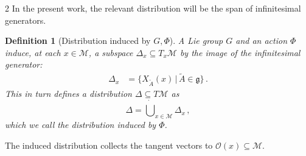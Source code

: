 \documentclass{article}
\newtheorem{definition}[theorem]{Definition}
\newcommand{\yannik}[1]{\textcolor{blue}{\textbf{YW}:~#1}}
\newcommand{\federico}[1]{\textcolor{BrickRed}{\textbf{FC}:~#1}}
\newcommand{\M}{\mathcal{M}}                                %
\newcommand{\g}{\mathfrak{g}}                               %
\newcommand{\state}{x}
\newcommand{\appstate}{\bar{x}}
\begin{document}
\begin{multicols}{2}
In the present work, the relevant distribution will be the span of infinitesimal generators.



\begin{definition}[Distribution induced by $G,\Phi$]\label{def:induced_distribution}
    A Lie group $G$ and an action $\Phi$ induce, at each $\state \in \M$, a subspace $\Delta_\state \subseteq T_\state \M$ by the image of the infinitesimal generator: %
    \begin{align}
        \Delta_\state %
        &= \{ X_{\widetilde{A}}(x) \,|\, \widetilde{A} \in \g \}\,. %
    \end{align}
    This in turn defines a distribution $\Delta \subseteq T\M$ as
    \begin{equation}
        \Delta = \dot{\bigcup}_{\state\in\M} \Delta_\state\,,
    \end{equation}
    which we call the distribution induced by $\Phi$.
\end{definition}

The induced distribution collects the tangent vectors to $\mathcal{O}(\state) \subseteq \M$. %


\end{multicols}
\end{document}
